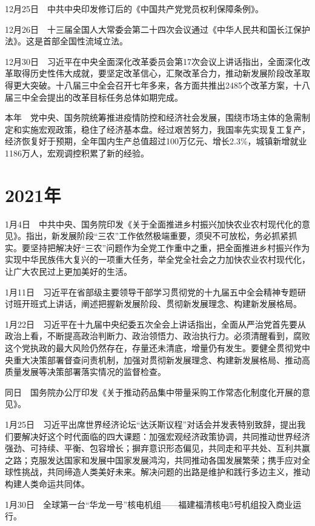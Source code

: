 \documentclass[10pt,a4paper,twocolumn]{book}
\begin{document}
12月25日　中共中央印发修订后的《中国共产党党员权利保障条例》。

12月26日　十三届全国人大常委会第二十四次会议通过《中华人民共和国长江保护法》。这是首部全国性流域立法。

12月30日　习近平在中央全面深化改革委员会第17次会议上讲话指出，全面深化改革取得历史性伟大成就，要坚定改革信心，汇聚改革合力，推动新发展阶段改革取得更大突破。十八届三中全会召开七年多来，各方面共推出2485个改革方案，十八届三中全会提出的改革目标任务总体如期完成。

本年　党中央、国务院统筹推进疫情防控和经济社会发展，围绕市场主体的急需制定和实施宏观政策，稳住了经济基本盘。经过艰苦努力，我国率先实现复工复产，经济恢复好于预期，全年国内生产总值超过100万亿元、增长2.3\%，城镇新增就业1186万人，宏观调控积累了新的经验。

\section{2021年}

1月4日　中共中央、国务院印发《关于全面推进乡村振兴加快农业农村现代化的意见》。指出，新发展阶段“三农”工作依然极端重要，须臾不可放松，务必抓紧抓实。要坚持把解决好“三农”问题作为全党工作重中之重，把全面推进乡村振兴作为实现中华民族伟大复兴的一项重大任务，举全党全社会之力加快农业农村现代化，让广大农民过上更加美好的生活。

1月11日　习近平在省部级主要领导干部学习贯彻党的十九届五中全会精神专题研讨班开班式上讲话，阐述把握新发展阶段、贯彻新发展理念、构建新发展格局。

1月22日　习近平在十九届中央纪委五次全会上讲话指出，全面从严治党首先要从政治上看，不断提高政治判断力、政治领悟力、政治执行力。必须清醒看到，腐败这个党执政的最大风险仍然存在，存量还未清底，增量仍有发生。要健全贯彻党中央重大决策部署督查问责机制，加强对贯彻新发展理念、构建新发展格局、推动高质量发展等决策部署落实情况的监督检查。

同日　国务院办公厅印发《关于推动药品集中带量采购工作常态化制度化开展的意见》。

1月25日　习近平出席世界经济论坛“达沃斯议程”对话会并发表特别致辞，提出我们要解决好这个时代面临的四大课题：加强宏观经济政策协调，共同推动世界经济强劲、可持续、平衡、包容增长；摒弃意识形态偏见，共同走和平共处、互利共赢之路；克服发达国家和发展中国家发展鸿沟，共同推动各国发展繁荣；携手应对全球性挑战，共同缔造人类美好未来。解决问题的出路是维护和践行多边主义，推动构建人类命运共同体。

1月30日　全球第一台“华龙一号”核电机组——福建福清核电5号机组投入商业运行。
\end{document}
